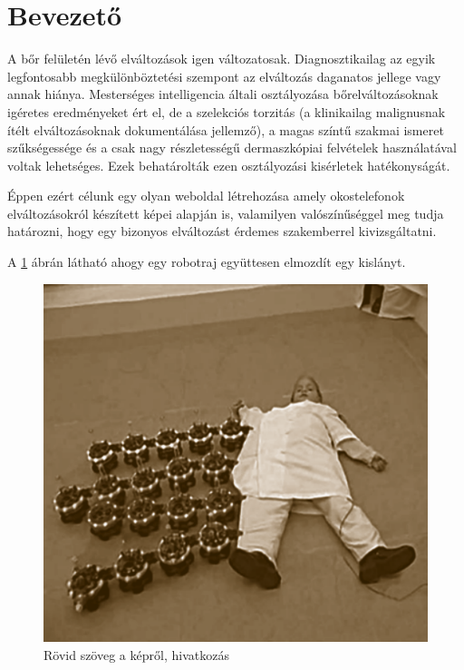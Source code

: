 \section{Bevezető}
A bőr felületén lévő elváltozások igen változatosak. Diagnosztikailag az egyik
legfontosabb megkülönböztetési szempont az elváltozás daganatos jellege vagy 
annak hiánya.
Mesterséges intelligencia általi osztályozása bőrelváltozásoknak igéretes eredményeket 
ért el, de a szelekciós torzitás (a klinikailag malignusnak ítélt elváltozásoknak 
dokumentálása jellemző), a magas színtű szakmai ismeret szűkségessége és a csak nagy
részletességű dermaszkópiai felvételek használatával voltak lehetséges.
Ezek behatárolták ezen osztályozási kisérletek hatékonyságát.

Éppen ezért célunk egy olyan weboldal létrehozása amely okostelefonok elváltozásokról
készített képei alapján is, valamilyen valószínűséggel meg tudja határozni, hogy egy
bizonyos elváltozást érdemes szakemberrel kivizsgáltatni.

 A \ref{fig:child_dragged} ábrán látható ahogy egy robotraj együttesen elmozdít egy kislányt.

\begin{figure}[h]
    \centering
    \includegraphics[scale=0.6]{figures/images/literature/child_dragged_robots.png}
    \caption{Rövid szöveg a képről, hivatkozás \cite{parker2016multiple}}
    \label{fig:child_dragged}
\end{figure}

